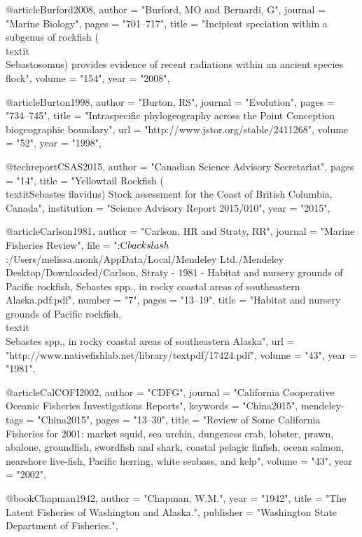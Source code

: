 @article{Burford2008,
    author = "{Burford, MO and Bernardi, G}",
    journal = "{Marine Biology}",
    pages = "{701--717}",
    title = "{{Incipient speciation within a subgenus of rockfish (\\textit\\{Sebastosomus}) provides evidence of recent radiations within an ancient species flock}}",
    volume = "{154}",
    year = "{2008}",
}

@article{Burton1998,
    author = "{Burton, RS}",
    journal = "{Evolution}",
    pages = "{734--745}",
    title = "{{Intraspecific phylogeography across the Point Conception biogeographic boundary}}",
    url = "{http://www.jstor.org/stable/2411268}",
    volume = "{52}",
    year = "{1998}",
}

@techreport{CSAS2015,
    author = "{{Canadian Science Advisory Secretariat}}",
    pages = "{14}",
    title = "{{Yellowtail Rockfish (\\textit{{Sebastes} flavidus}) Stock assessment for the Coast of British Columbia, Canada}}",
    institution = "{{Science Advisory Report 2015/010}}",
    year = "{2015}",
}

@article{Carlson1981,
    author = "{Carlson, HR and Straty, RR}",
    journal = "{Marine Fisheries Review}",
    file = "{:C$\\backslash$:/Users/melissa.monk/AppData/Local/Mendeley Ltd./Mendeley Desktop/Downloaded/Carlson, Straty - 1981 - Habitat and nursery grounds of Pacific rockfish, Sebastes spp., in rocky coastal areas of southeastern Alaska.pdf:pdf}",
    number = "{7}",
    pages = "{13--19}",
    title = "{{Habitat and nursery grounds of Pacific rockfish, \\textit\\{{Sebastes}} spp., in rocky coastal areas of southeastern Alaska}}",
    url = "{http://www.nativefishlab.net/library/textpdf/17424.pdf}",
    volume = "{43}",
    year = "{1981}",
}

@article{CalCOFI2002,
    author = "{CDFG}",
    journal = "{California Cooperative Oceanic Fisheries Investigations Reports}",
    keywords = "{China2015}",
    mendeley-tags = "{China2015}",
    pages = "{13--30}",
    title = "{{Review of Some California Fisheries for 2001: market squid, sea urchin, dungeness crab, lobster, prawn, abalone, groundfish, swordfish and shark, coastal pelagic finfish, ocean salmon, nearshore live-fish, Pacific herring, white seabass, and kelp}}",
    volume = "{43}",
    year = "{2002}",
}

@book{Chapman1942,
    author = "{Chapman, W.M.}",
    year = "{1942}",
    title = "{The Latent Fisheries of Washington and Alaska.}",
    publisher = "{Washington State Department of Fisheries.}",
}

